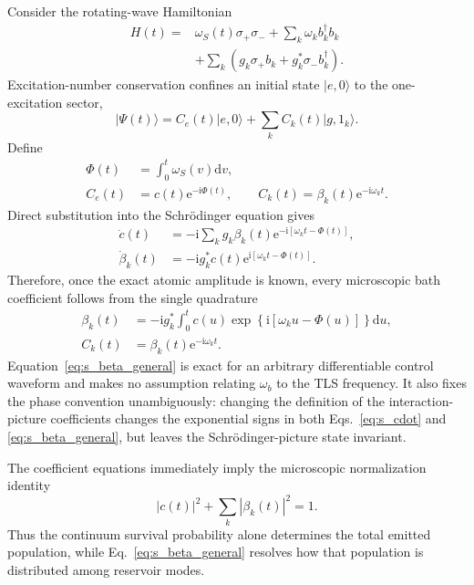 \documentclass[reprint,superscriptaddress,floatfix,amsmath,amssymb,prresearch,aps]{revtex4-2}
\newcommand{\dd}{\mathrm{d}}
\newcommand{\ee}{\mathrm{e}}
\newcommand{\ii}{\mathrm{i}}
\begin{document}
Consider the rotating-wave Hamiltonian
\begin{equation}
\begin{aligned}
H(t)={}&\omega_S(t)\sigma_+\sigma_-+\sum_k\omega_k b_k^\dagger b_k\\
&+\sum_k\left(g_k\sigma_+b_k+g_k^*\sigma_-b_k^\dagger\right).
\end{aligned}
\label{eq:s_H}
\end{equation}
Excitation-number conservation confines an initial state \(|e,0\rangle\) to
the one-excitation sector,
\begin{equation}
|\Psi(t)\rangle=C_e(t)|e,0\rangle
+\sum_k C_k(t)|g,1_k\rangle.
\label{eq:s_state}
\end{equation}
Define
\begin{equation}
\begin{aligned}
\Phi(t)&=\int_0^t\omega_S(v)\dd v,\\
C_e(t)&=c(t)\ee^{-\ii\Phi(t)},\qquad
C_k(t)=\beta_k(t)\ee^{-\ii\omega_kt}.
\end{aligned}
\label{eq:s_phases}
\end{equation}
Direct substitution into the Schr\"odinger equation gives
\begin{align}
\dot c(t)&=-\ii\sum_k g_k\beta_k(t)
 \ee^{-\ii[\omega_kt-\Phi(t)]},
\label{eq:s_cdot}\\
\dot\beta_k(t)&=-\ii g_k^*c(t)
 \ee^{\ii[\omega_kt-\Phi(t)]}.
\label{eq:s_betadot}
\end{align}
Therefore, once the exact atomic amplitude is known, every microscopic bath
coefficient follows from the single quadrature
\begin{equation}
\begin{aligned}
\beta_k(t)&=-\ii g_k^*\int_0^t c(u)
\exp\!\left\{\ii\left[\omega_ku-\Phi(u)\right]\right\}\dd u,\\
C_k(t)&=\beta_k(t)\ee^{-\ii\omega_kt}.
\end{aligned}
\label{eq:s_beta_general}
\end{equation}
Equation~\eqref{eq:s_beta_general} is exact for an arbitrary differentiable
control waveform and makes no assumption relating \(\omega_b\) to the TLS
frequency. It also fixes the phase convention unambiguously: changing the
definition of the interaction-picture coefficients changes the exponential
signs in both Eqs.~\eqref{eq:s_cdot} and \eqref{eq:s_beta_general}, but leaves
the Schr\"odinger-picture state invariant.

The coefficient equations immediately imply the microscopic normalization
identity
\begin{equation}
|c(t)|^2+\sum_k|\beta_k(t)|^2=1.
\label{eq:s_norm}
\end{equation}
Thus the continuum survival probability alone determines the total emitted
population, while Eq.~\eqref{eq:s_beta_general} resolves how that population
is distributed among reservoir modes.
\end{document}
